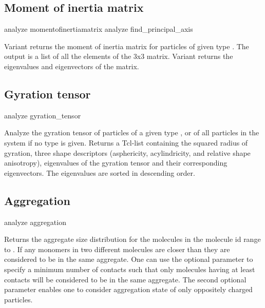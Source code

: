 \subsection{Moment of inertia matrix}
\label{analyze:momentofinteratiamatrix}
\label{analyze:find-principal-axis}

\begin{essyntax}
   analyze momentofinertiamatrix {  } 
   analyze find_principal_axis 
\end{essyntax}
Variant  returns the moment of inertia matrix for particles
of given type . The output is a list of all the elements
of the 3x3 matrix. Variant  returns the eigenvalues and
eigenvectors of the matrix.

\subsection{Gyration tensor}
\label{analyze:gyration-tensor}

\begin{essyntax}
  analyze gyration\_tensor  
\end{essyntax}
Analyze the gyration tensor of particles of a given type ,
or of all particles in the system if no type is given.
Returns a Tcl-list containing the squared radius of gyration,
 three shape descriptors (asphericity, acylindricity,
 and relative shape anisotropy), eigenvalues of the gyration tensor and their
corresponding eigenvectors. The eigenvalues are sorted in descending order.

\subsection{Aggregation}
\label{analyze:aggregation}

\begin{essyntax}
  analyze aggregation  
   
\end{essyntax}
Returns the aggregate size distribution for the molecules in the
molecule id range  to . If any
monomers in two different molecules are closer than
 they are considered to be in the same aggregate.
One can use the optional  parameter to specify a
minimum number of contacts such that only molecules having at least
 contacts will be considered to be in the same
aggregate. The second optional parameter 
enables one to consider aggregation state of only oppositely charged
particles.

